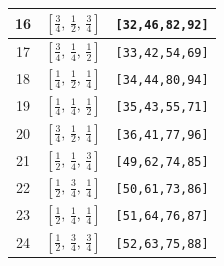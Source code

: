 \documentclass[fleqn,8pt]{jsarticle}
\begin{document}
\begin{longtable}{ccc}
16 & $\left[ \frac{3}{4},\, \frac{1}{2},\, \frac{3}{4} \right]$ & {\tt [32,46,82,92]} \\ \hline
17 & $\left[ \frac{3}{4},\, \frac{1}{4},\, \frac{1}{2} \right]$ & {\tt [33,42,54,69]} \\ \hline
18 & $\left[ \frac{1}{4},\, \frac{1}{2},\, \frac{1}{4} \right]$ & {\tt [34,44,80,94]} \\ \hline
19 & $\left[ \frac{1}{4},\, \frac{1}{4},\, \frac{1}{2} \right]$ & {\tt [35,43,55,71]} \\ \hline
20 & $\left[ \frac{3}{4},\, \frac{1}{2},\, \frac{1}{4} \right]$ & {\tt [36,41,77,96]} \\ \hline
21 & $\left[ \frac{1}{2},\, \frac{1}{4},\, \frac{3}{4} \right]$ & {\tt [49,62,74,85]} \\ \hline
22 & $\left[ \frac{1}{2},\, \frac{3}{4},\, \frac{1}{4} \right]$ & {\tt [50,61,73,86]} \\ \hline
23 & $\left[ \frac{1}{2},\, \frac{1}{4},\, \frac{1}{4} \right]$ & {\tt [51,64,76,87]} \\ \hline
24 & $\left[ \frac{1}{2},\, \frac{3}{4},\, \frac{3}{4} \right]$ & {\tt [52,63,75,88]} \\
\end{longtable}
\renewcommand{\arraystretch}{1.2}
\end{document}
